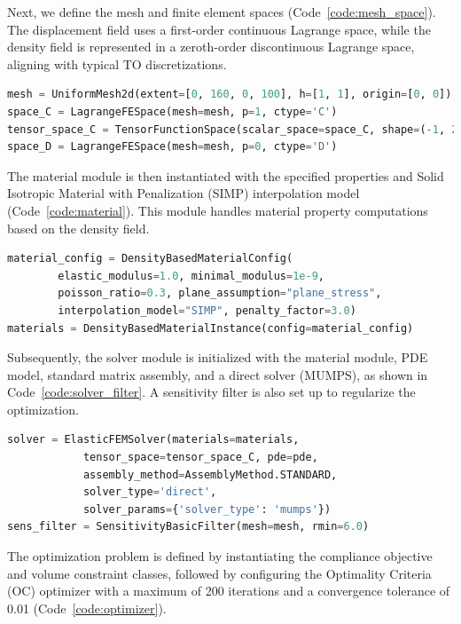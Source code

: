 \documentclass[mathpazo]{cicp}
\begin{document}
Next, we define the mesh and finite element spaces (Code~\ref{code:mesh_space}). The displacement field uses a first-order continuous Lagrange space, while the density field is represented in a zeroth-order discontinuous Lagrange space, aligning with typical TO discretizations.

\begin{lstlisting}[language=python, caption={Mesh and function space definitions}, label={code:mesh_space}]
mesh = UniformMesh2d(extent=[0, 160, 0, 100], h=[1, 1], origin=[0, 0])
space_C = LagrangeFESpace(mesh=mesh, p=1, ctype='C')
tensor_space_C = TensorFunctionSpace(scalar_space=space_C, shape=(-1, 2))
space_D = LagrangeFESpace(mesh=mesh, p=0, ctype='D')
\end{lstlisting}

The material module is then instantiated with the specified properties and Solid Isotropic Material with Penalization (SIMP) interpolation model (Code~\ref{code:material}). This module handles material property computations based on the density field.

\begin{lstlisting}[language=python, caption={Material module}, label={code:material}]
material_config = DensityBasedMaterialConfig(
		elastic_modulus=1.0, minimal_modulus=1e-9, 
		poisson_ratio=0.3, plane_assumption="plane_stress",  
		interpolation_model="SIMP", penalty_factor=3.0)
materials = DensityBasedMaterialInstance(config=material_config)
\end{lstlisting}

Subsequently, the solver module is initialized with the material module, PDE model, standard matrix assembly, and a direct solver (MUMPS), as shown in Code~\ref{code:solver_filter}. A sensitivity filter is also set up to regularize the optimization.

\begin{lstlisting}[language=python, caption={Solver and filter module}, label={code:solver_filter}] 
solver = ElasticFEMSolver(materials=materials,
			tensor_space=tensor_space_C, pde=pde,
			assembly_method=AssemblyMethod.STANDARD,
			solver_type='direct',
			solver_params={'solver_type': 'mumps'})
sens_filter = SensitivityBasicFilter(mesh=mesh, rmin=6.0)
\end{lstlisting}

The optimization problem is defined by instantiating the compliance objective and volume constraint classes, followed by configuring the Optimality Criteria (OC) optimizer with a maximum of 200 iterations and a convergence tolerance of 0.01 (Code~\ref{code:optimizer}).
\end{document}
